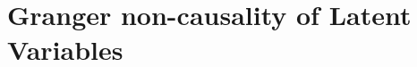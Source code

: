 
\section{Granger non-causality of Latent Variables}
\label{app: Granger non-causality of Latent Variables}

